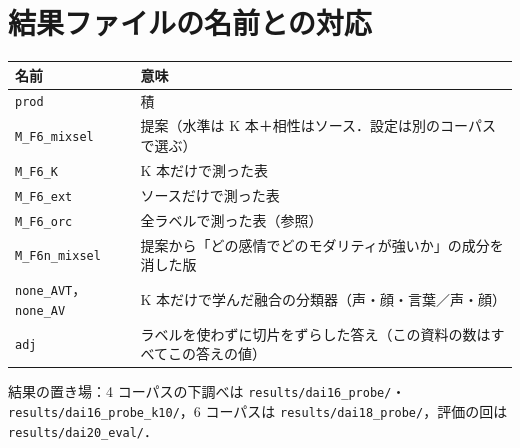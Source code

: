 \documentclass[a4paper,11pt]{ltjsarticle}
\begin{document}
\section{結果ファイルの名前との対応}
\begin{center}
\small
\begin{tabular}{>{\raggedright}p{4.2cm}p{11.2cm}}
\toprule
名前 & 意味 \\
\midrule
\texttt{prod} & 積 \\
\texttt{M\_F6\_mixsel} & 提案（水準は K 本＋相性はソース．設定は別のコーパスで選ぶ） \\
\texttt{M\_F6\_K} & K 本だけで測った表 \\
\texttt{M\_F6\_ext} & ソースだけで測った表 \\
\texttt{M\_F6\_orc} & 全ラベルで測った表（参照） \\
\texttt{M\_F6n\_mixsel} & 提案から「どの感情でどのモダリティが強いか」の成分を消した版 \\
\texttt{none\_AVT}，\texttt{none\_AV} & K 本だけで学んだ融合の分類器（声・顔・言葉／声・顔） \\
\texttt{adj} & ラベルを使わずに切片をずらした答え（この資料の数はすべてこの答えの値） \\
\bottomrule
\end{tabular}
\end{center}
結果の置き場：4 コーパスの下調べは \texttt{results/dai16\_probe/}・\texttt{results/dai16\_probe\_k10/}，6 コーパスは \texttt{results/dai18\_probe/}，評価の回は \texttt{results/dai20\_eval/}．
\end{document}
